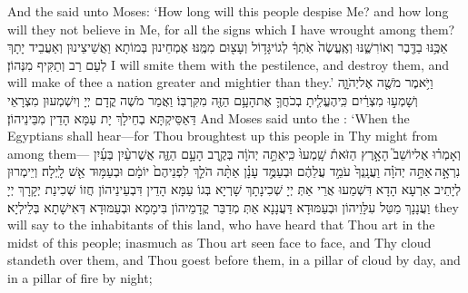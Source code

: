 {And the \lord\space said unto Moses: ‘How long will this people despise Me? and how long will they not believe in Me, for all the signs which I have wrought among them?}{}
{אַכֶּ֥נּוּ בַדֶּ֖בֶר וְאוֹרִשֶׁ֑נּוּ וְאֶֽעֱשֶׂה֙ אֹֽתְךָ֔ לְגוֹי\maqqaf גָּד֥וֹל וְעָצ֖וּם מִמֶּֽנּוּ׃}
{אֶמְחֵינוּן בְּמוֹתָא וַאֲשֵׁיצֵינוּן וְאַעֲבֵיד יָתָךְ לְעַם רַב וְתַקִּיף מִנְּהוֹן׃}
{I will smite them with the pestilence, and destroy them, and will make of thee a nation greater and mightier than they.’}{}
{וַיֹּ֥אמֶר מֹשֶׁ֖ה אֶל\maqqaf יְהֹוָ֑ה וְשָׁמְע֣וּ מִצְרַ֔יִם כִּֽי\maqqaf הֶעֱלִ֧יתָ בְכֹחֲךָ֛ אֶת\maqqaf הָעָ֥ם הַזֶּ֖ה מִקִּרְבּֽוֹ׃}
{וַאֲמַר מֹשֶׁה קֳדָם יְיָ וְיִשְׁמְעוּן מִצְרָאֵי דַּאַסֵּיקְתָּא בְחֵילָךְ יָת עַמָּא הָדֵין מִבֵּינֵיהוֹן׃}
{And Moses said unto the \lord: ‘When the Egyptians shall hear—for Thou broughtest up this people in Thy might from among them—}{}
{וְאָמְר֗וּ אֶל\maqqaf יוֹשֵׁב֮ הָאָ֣רֶץ הַזֹּאת֒ שָֽׁמְעוּ֙ כִּֽי\maqqaf אַתָּ֣ה יְהֹוָ֔ה בְּקֶ֖רֶב הָעָ֣ם הַזֶּ֑ה אֲשֶׁר\maqqaf עַ֨יִן בְּעַ֜יִן נִרְאָ֣ה \legarmeh  אַתָּ֣ה יְהֹוָ֗ה וַעֲנָֽנְךָ֙ עֹמֵ֣ד עֲלֵהֶ֔ם וּבְעַמֻּ֣ד עָנָ֗ן אַתָּ֨ה הֹלֵ֤ךְ לִפְנֵיהֶם֙ יוֹמָ֔ם וּבְעַמּ֥וּד אֵ֖שׁ לָֽיְלָה׃}
{וְיֵימְרוּן לְיָתֵיב אַרְעָא הָדָא דִּשְׁמַעוּ אֲרֵי אַתְּ יְיָ שְׁכִינָתָךְ שָׁרְיָא בְּגוֹ עַמָּא הָדֵין דִּבְעֵינֵיהוֹן חֲזוֹ שְׁכִינַת יְקָרָךְ יְיָ וַעֲנָנָךְ מַטַּל עִלָּוֵיהוֹן וּבְעַמּוּדָא דַּעֲנָנָא אַתְּ מְדַבַּר קֳדָמֵיהוֹן בִּימָמָא וּבְעַמּוּדָא דְּאִישָׁתָא בְּלֵילְיָא׃}
{they will say to the inhabitants of this land, who have heard that Thou \lord\space art in the midst of this people; inasmuch as Thou \lord\space art seen face to face, and Thy cloud standeth over them, and Thou goest before them, in a pillar of cloud by day, and in a pillar of fire by night;}{}
